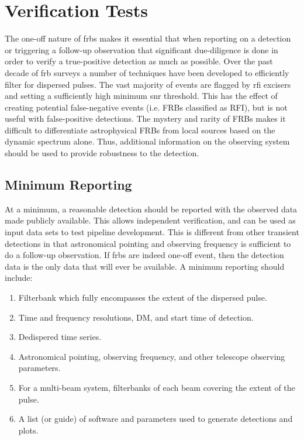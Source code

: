 \documentclass[a4paper,fleqn,usenatbib]{mnras}
\begin{document}
\section{Verification Tests}

The one-off nature of \glspl{frb} makes it essential that when reporting on a
detection or triggering a follow-up observation that significant due-diligence
is done in order to verify a true-positive detection as much as possible. Over the
past decade of \gls{frb} surveys a number of techniques have been developed to
efficiently filter for dispersed pulses. The vast majority of events are flagged
by \gls{rfi} excisers and setting a sufficiently high minimum \gls{snr}
threshold. This has the effect of creating potential false-negative events (i.e.
FRBs classified as RFI), but is not useful with false-positive detections. The
mystery and rarity of FRBs makes it difficult to differentiate astrophysical FRBs
from local sources based on the dynamic spectrum alone. Thus, additional
information on the observing system should be used to provide robustness to the
detection.

\subsection{Minimum Reporting}

At a minimum, a reasonable detection should be reported with the observed data
made publicly available.  This allows independent verification, and can be used
as input data sets to test pipeline development.  This is different from other
transient detections in that astronomical pointing and observing frequency is
sufficient to do a follow-up observation. If \glspl{frb} are indeed one-off
event, then the detection data is the only data that will ever be available. A
minimum reporting should include:

\begin{enumerate}
    \item Filterbank which fully encompasses the extent of the dispersed pulse.
    \item Time and frequency resolutions, DM, and start time of detection.
    \item Dedispered time series.
    \item Astronomical pointing, observing frequency, and other telescope
    observing parameters.
    \item For a multi-beam system, filterbanks of each beam covering the extent
    of the pulse.
    \item A list (or guide) of software and parameters used to generate
    detections and plots.
\end{enumerate}
\end{document}
